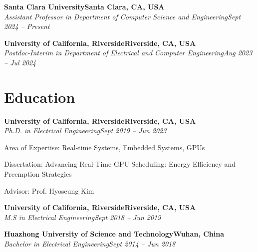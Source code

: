\documentclass[letterpaper,10pt]{article}
\newcommand{\heading}[2]{
  \hspace{10pt}#1\hfill#2\\
}
\newcommand{\headingBf}[2]{
  \heading{\textbf{#1}}{\textbf{#2}}
}
\newcommand{\headingIt}[2]{
  \heading{\textit{#1}}{\textit{#2}}
}
\newenvironment{resume_list}{
  \vspace{-7pt}
  \begin{itemize}[itemsep=-2px, parsep=1pt, leftmargin=30pt]
}{
  \end{itemize}
}
\begin{document}
    \headingBf{Santa Clara University}{Santa Clara, CA, USA}
    \headingIt{Assistant Professor in Department of Computer Science and Engineering}{Sept 2024 -- Present}
    \vspace{5pt}

    \headingBf{University of California, Riverside}{Riverside, CA, USA}
    \headingIt{Postdoc-Interim in Department of Electrical and Computer Engineering}{Aug 2023 -- Jul 2024}

  \section{Education}

    \headingBf{University of California, Riverside}{Riverside, CA, USA}
    \headingIt{Ph.D. in Electrical Engineering}{Sept 2019 -- Jun 2023}
    \begin{resume_list}
        \item Area of Expertise: Real-time Systems, Embedded Systems, GPUs
        \item Dissertation: Advancing Real-Time GPU Scheduling: Energy Efficiency and Preemption Strategies
        \item Advisor: Prof. Hyoseung Kim
    \end{resume_list}

    \headingBf{University of California, Riverside}{Riverside, CA, USA}
    \headingIt{M.S in Electrical Engineering}{Sept 2018 -- Jun 2019}
    \vspace{5pt}

    \headingBf{Huazhong University of Science and Technology}{Wuhan, China}
    \headingIt{Bachelor in Electrical Engineering}{Sept 2014 -- Jun 2018}

\end{document}
